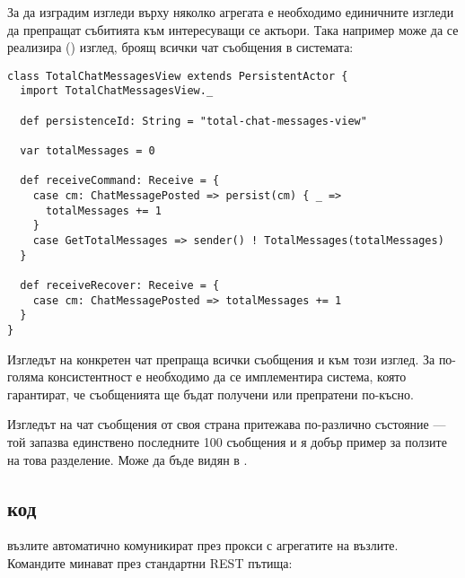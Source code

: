 За да изградим изгледи върху няколко агрегата е необходимо единичните изгледи да препращат събитията към интересуващи се актьори. Така например може да се реализира  () изглед, броящ всички чат съобщения в системата:

\begin{lstlisting}
class TotalChatMessagesView extends PersistentActor {
  import TotalChatMessagesView._
  
  def persistenceId: String = "total-chat-messages-view"
  
  var totalMessages = 0
  
  def receiveCommand: Receive = {
    case cm: ChatMessagePosted => persist(cm) { _ =>
      totalMessages += 1
    }
    case GetTotalMessages => sender() ! TotalMessages(totalMessages)
  }
      
  def receiveRecover: Receive = {
    case cm: ChatMessagePosted => totalMessages += 1
  }
}
\end{lstlisting}

Изгледът на конкретен чат препраща всички съобщения и към този изглед. За по-голяма консистентност е необходимо да се имплементира система, която гарантират, че съобщенията ще бъдат получени или препратени по-късно.

Изгледът на чат съобщения от своя страна притежава по-различно състояние — той запазва единствено последните 100 съобщения и я добър пример за ползите на това разделение. Може да бъде видян в .

\subsection{ код}

 възлите автоматично комуникират през прокси с агрегатите на  възлите. Командите минават през стандартни REST пътища:

